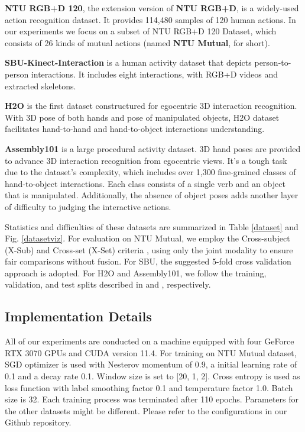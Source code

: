 \documentclass[letterpaper, 10 pt, conference]{ieeeconf}
\begin{document}
\textbf{NTU RGB+D 120}\cite{NTU120}, the extension version of \textbf{NTU RGB+D}\cite{NTU60}, is a widely-used action recognition dataset. It provides 114,480 samples of 120 human actions. In our experiments we focus on a subset of NTU RGB+D 120 Dataset, which consists of 26 kinds of mutual actions (named \textbf{NTU Mutual}, for short). 

\textbf{SBU-Kinect-Interaction}\cite{SBU} is a human activity
dataset that depicts person-to-person interactions. It includes eight interactions, with RGB+D videos and extracted skeletons.

\textbf{H2O}\cite{H2O_TA-GCN2021} is the first dataset constructured for egocentric 3D interaction recognition. With 3D pose of both hands and pose of manipulated objects, H2O dataset facilitates hand-to-hand and hand-to-object interactions understanding.

\textbf{Assembly101}\cite{Assembly101} is a large procedural activity dataset. 3D hand poses are provided to advance 3D interaction recognition from egocentric views. It's a tough task due to the dataset's complexity, which includes over 1,300 fine-grained classes of hand-to-object interactions. Each class consists of a single verb and an object that is manipulated. Additionally, the absence of object poses adds another layer of difficulty to judging the interactive actions.

Statistics and difficulties of these datasets are summarized in Table \ref{dataset} and Fig. \ref{datasetviz}. For evaluation on NTU Mutual, we employ the Cross-subject (X-Sub) and Cross-set (X-Set) criteria \cite{NTU120}, using only the joint modality to ensure fair comparisons without fusion. For SBU, the suggested 5-fold cross validation approach \cite{SBU} is adopted. For H2O and Assembly101, we follow the training, validation, and test splits described in \cite{H2O_TA-GCN2021} and \cite{Assembly101}, respectively.

\subsection{Implementation Details}
All of our experiments are conducted on a machine equipped with four GeForce RTX 3070 GPUs and CUDA version 11.4. For training on NTU Mutual dataset, SGD optimizer is used with Nesterov momentum of 0.9, a initial learning rate of 0.1 and a decay rate 0.1. Window size is set to [20, 1, 2]. Cross entropy is used as loss function with label smoothing factor 0.1 and temperature factor 1.0. Batch size is 32. Each training process was terminated after 110 epochs. Parameters for the other datasets might be different. Please refer to the configurations in our Github repository. 
\end{document}
